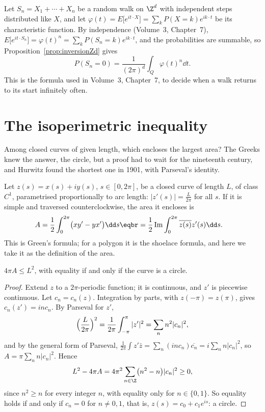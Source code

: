 \begin{example}
Let $S_n=X_1+\cdots+X_n$ be a random walk on $\Z^d$ with independent steps distributed like $X$, and let $\varphi(t)=E\bigl[e^{it\cdot X}\bigr]=\sum_kP(X=k)e^{ik\cdot t}$
be its characteristic function. By independence (Volume~3, Chapter~7), $E\bigl[e^{it\cdot S_n}\bigr]=\varphi(t)^n=\sum_kP(S_n=k)e^{ik\cdot t}$, and the
probabilities are summable, so Proposition~\ref{prop:inversionZd} gives
\[
P(S_n=0)=\frac1{(2\pi)^d}\int_Q\varphi(t)^n\dd t.
\]
This is the formula used in Volume~3, Chapter~7, to decide when a walk returns to its start infinitely often.
\end{example}

\section{The isoperimetric inequality}

Among closed curves of given length, which encloses the largest area? The Greeks knew the answer, the circle, but a proof
had to wait for the nineteenth century, and Hurwitz found the shortest one in 1901, with Parseval's identity.

Let $z(s)=x(s)+iy(s)$, $s\in[0,2\pi]$, be a closed curve of length $L$, of class $C^1$, parametrised proportionally to arc length:
$|z'(s)|=\frac L{2\pi}$ for all $s$. If it is simple and traversed counterclockwise, the area it encloses is
\[
\begin{aligned}A&=\frac12\int_0^{2\pi}\bigl(xy'-yx'\bigr)\dd s\eqbr=\frac12\operatorname{Im}\int_0^{2\pi}\overline{z(s)}z'(s)\dd s.\end{aligned}
\]
This is Green's formula; for a polygon it is the shoelace formula, and here we take it as the definition of the area.

\begin{theorem}\label{thm:isoperimetric}
$4\pi A\le L^2$, with equality if and only if the curve is a circle.
\end{theorem}
\begin{proof}
Extend $z$ to a $2\pi$-periodic function; it is continuous, and $z'$ is piecewise continuous. Let $c_n=c_n(z)$. Integration by parts,
with $z(-\pi)=z(\pi)$, gives $c_n(z')=inc_n$. By Parseval for $z'$,
\[
\Bigl(\frac L{2\pi}\Bigr)^2=\frac1{2\pi}\int_{-\pi}^\pi|z'|^2=\sum_nn^2|c_n|^2,
\]
and by the general form of Parseval, $\frac1{2\pi}\int z'\bar z=\sum_n(inc_n)\overline{c_n}=i\sum_nn|c_n|^2$, so $A=\pi\sum_nn|c_n|^2$. Hence
\[
L^2-4\pi A=4\pi^2\sum_{n\in\Z}\bigl(n^2-n\bigr)|c_n|^2\ge0,
\]
since $n^2\ge n$ for every integer $n$, with equality only for $n\in\{0,1\}$. So equality holds if and only if $c_n=0$ for $n\ne0,1$,
that is, $z(s)=c_0+c_1e^{is}$: a circle.
\end{proof}

